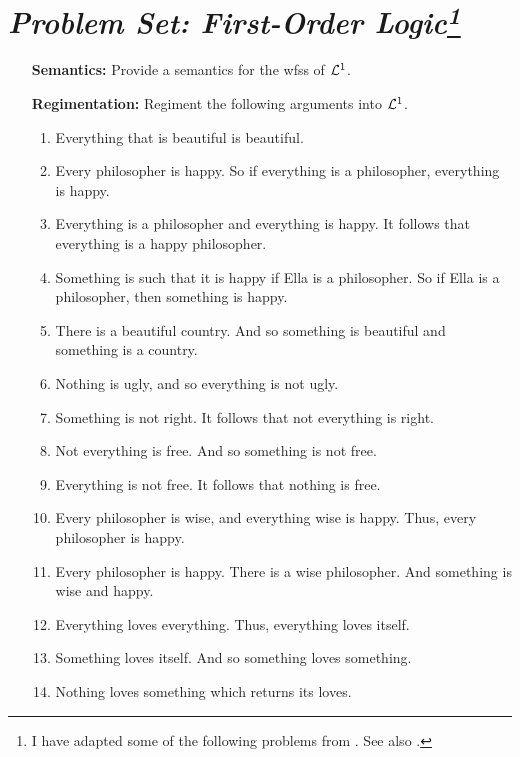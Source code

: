 \documentclass[a4paper, 11pt]{article} %
\begin{document}
\section*{\it Problem Set: First-Order Logic\footnote{I have adapted some of the following problems from \citet{Carr2013}. See also \citet{Halbach2010}.}}

\begin{enumerate}[leftmargin=1.2in]
	\item[\bf Semantics:] Provide a semantics for the wfss of $\mathcal{L}^1$.
	\item[\bf Regimentation:] Regiment the following arguments into $\mathcal{L}^1$.
	      \begin{enumerate}[label=(\arabic*)]\small
		      \item Everything that is beautiful is beautiful.
		      \item Every philosopher is happy. So if everything is a philosopher, everything is happy.
		      \item Everything is a philosopher and everything is happy. It follows that everything is a happy philosopher.
		      \item Something is such that it is happy if Ella is a philosopher. So if Ella is a philosopher, then something is happy.
		      \item There is a beautiful country. And so something is beautiful and something is a country.
		      \item Nothing is ugly, and so everything is not ugly.
		      \item Something is not right. It follows that not everything is right.
		      \item Not everything is free. And so something is not free.
		      \item Everything is not free. It follows that nothing is free.
		      \item Every philosopher is wise, and everything wise is happy. Thus, every philosopher is happy.
		      \item Every philosopher is happy. There is a wise philosopher. And something is wise and happy.
		      \item Everything loves everything. Thus, everything loves itself.
		      \item Something loves itself. And so something loves something.
		      \item Nothing loves something which returns its loves.

\end{enumerate}
\end{enumerate}
\end{document}

